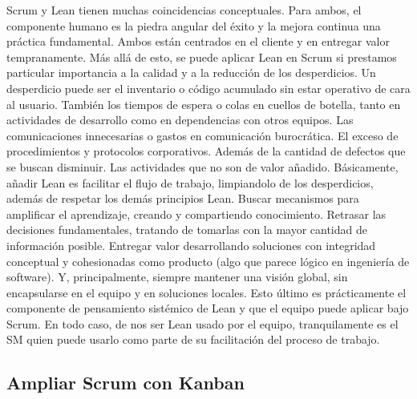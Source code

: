 Scrum y Lean tienen muchas coincidencias conceptuales. Para ambos, el componente humano es la piedra angular del éxito y la mejora continua una práctica fundamental. Ambos están centrados en el cliente y en entregar valor tempranamente. Más allá de esto, se puede aplicar Lean en Scrum si prestamos particular importancia a la calidad y a la reducción de los desperdicios. Un desperdicio puede ser el inventario o código acumulado sin estar operativo de cara al usuario. También los tiempos de espera o colas en cuellos de botella, tanto en actividades de desarrollo como en dependencias con otros equipos. Las comunicaciones innecesarias o gastos en comunicación burocrática. El exceso de procedimientos y protocolos corporativos. Además de la cantidad de defectos que se buscan disminuir. Las actividades que no son de valor añadido. Básicamente, añadir Lean es facilitar el flujo de trabajo, limpiandolo de los desperdicios, además de respetar los demás principios Lean. Buscar mecanismos para amplificar el aprendizaje, creando y compartiendo conocimiento. Retrasar las decisiones fundamentales, tratando de tomarlas con la mayor cantidad de información posible. Entregar valor desarrollando soluciones con integridad conceptual y cohesionadas como producto (algo que parece lógico en ingeniería de software). Y, principalmente, siempre mantener una visión global, sin encapsularse en el equipo y en soluciones locales. Esto último es prácticamente el componente de pensamiento sistémico de Lean y que el equipo puede aplicar bajo Scrum. En todo caso, de nos ser Lean usado por el equipo, tranquilamente es el SM quien puede usarlo como parte de su facilitación del proceso de trabajo.

\subsection{Ampliar Scrum con Kanban}

